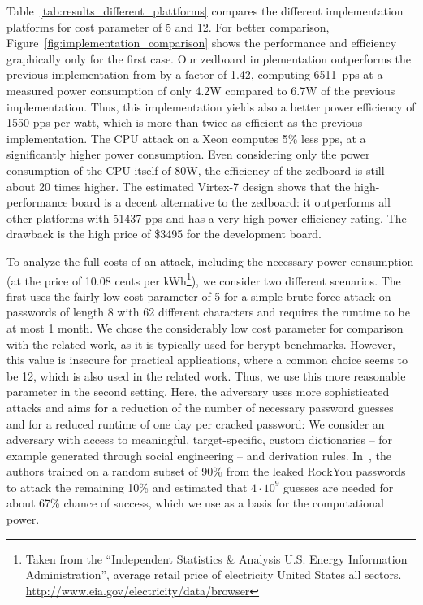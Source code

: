 Table~\ref{tab:results_different_plattforms} compares the different
implementation platforms for cost parameter of 5 and 12. For better
comparison, Figure~\ref{fig:implementation_comparison} shows the performance and
efficiency graphically only for the first case.
%
Our zedboard implementation outperforms the previous implementation from
\cite{WOOT/Malvoni14} by a factor of 1.42, computing 6511~pps at a measured
power consumption of only 4.2W compared to 6.7W of the previous
implementation. Thus, this implementation yields also a better power efficiency
of 1550 pps per watt, which is more than twice as efficient as the previous
implementation. The CPU attack on a Xeon computes 5\% less pps, at a
significantly higher power consumption. Even considering only the power
consumption of the CPU itself of 80W, the efficiency of the zedboard is still
about 20 times higher. The estimated Virtex-7 design shows that the
high-performance board is a decent alternative to the zedboard: it outperforms
all other platforms with 51437 pps and has a very high power-efficiency rating.
The drawback is the high price of \$3495 for the development board.

To analyze the full costs of an attack, including the necessary power
consumption (at the price of 10.08 cents per kWh\footnote{Taken from the
\enquote{Independent Statistics \& Analysis U.S. Energy Information
Administration}, average retail price of electricity United States all sectors.
\url{http://www.eia.gov/electricity/data/browser}}), we consider two different
scenarios. The first uses the fairly low cost parameter of 5 for a simple
brute-force attack on passwords of length 8 with 62 different characters and
requires the runtime to be at most 1 month. We chose the considerably low cost
parameter for comparison with the related work, as it is typically used for
bcrypt benchmarks. However, this value is insecure for practical
applications, where a common choice seems to be 12, which is also used in
the related work. Thus, we use this more reasonable parameter in the second setting.
Here, the adversary uses more sophisticated attacks and aims for a reduction of
the number of necessary password guesses and for a reduced runtime of one day
per cracked password: We consider an adversary with access to meaningful,
target-specific, custom dictionaries -- for example generated through social
engineering -- and derivation rules.
%
In~\cite{PBKDEvalutation}, the authors trained on a random subset of 90\% from
the leaked RockYou passwords to attack the remaining 10\% and estimated that
$\text{4} \cdot \text{10}^\text{9}$ guesses are needed for about 67\% chance of
success, which we use as a basis for the computational power.

